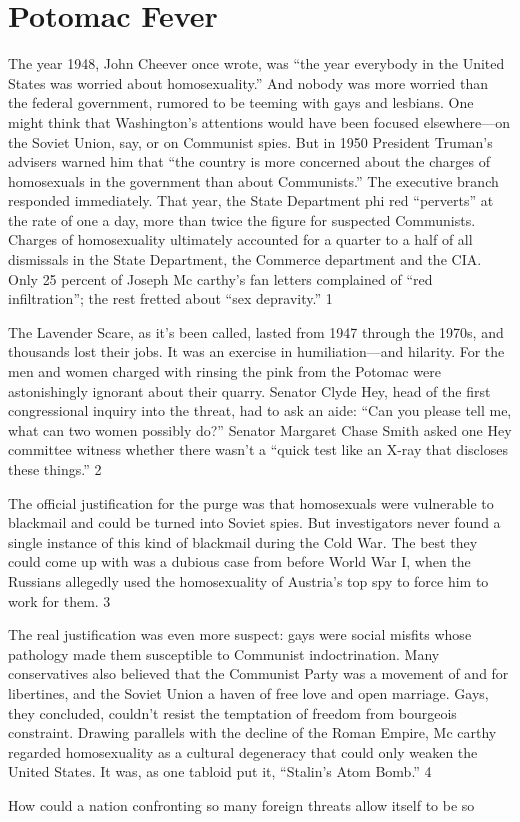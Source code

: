 {\chapter{Potomac Fever} } {\label{Potomac Fever} }{\par}{\textit{	} } {\par}{\par} {\textbf{\textit{	} } } {\par} 
	The year 1948, John Cheever once wrote, was “the year everybody in the United States was worried about homosexuality.” And nobody was more worried than the federal government, rumored to be teeming with gays and lesbians. One might think that Washington’s attentions would have been focused elsewhere—on the Soviet Union, say, or on Communist spies. But in 1950 President Truman’s advisers warned him that “the country is more concerned about the charges of homosexuals in the government than about Communists.” The executive branch responded immediately. That year, the State Department phi red “perverts” at the rate of one a day, more than twice the figure for suspected Communists. Charges of homosexuality ultimately accounted for a quarter to a half of all dismissals in the State Department, the Commerce department and the CIA. Only {\color{blue} 25 } percent of Joseph Mc carthy’s fan letters complained of “red infiltration”; the rest fretted about “sex depravity.” {\color{blue} 1 } {\par} The Lavender Scare, as it’s been called, lasted from 1947 through the 1970s, and thousands lost their jobs. It was an exercise in humiliation—and hilarity. For the men and women charged with rinsing the pink from the Potomac were astonishingly ignorant about their quarry. Senator Clyde Hey, head of the first congressional inquiry into the threat, had to ask an aide: “Can you please tell me, what can two women possibly do?” Senator Margaret Chase Smith asked one Hey committee witness whether there wasn’t a “quick test like an X-ray that discloses these things.” {\color{blue} 2 } {\par} The official justification for the purge was that homosexuals were vulnerable to blackmail and could be turned into Soviet spies. But investigators never found a single instance of this kind of blackmail during the Cold War. The best they could come up with was a dubious case from before World War I, when the Russians allegedly used the homosexuality of Austria’s top spy to force him to work for them. {\color{blue} 3 } {\par} The real justification was even more suspect: gays were social misfits whose pathology made them susceptible to Communist indoctrination. Many conservatives also believed that the Communist Party was a movement of and for libertines, and the Soviet Union a haven of free love and open marriage. Gays, they concluded, couldn’t resist the temptation of freedom from bourgeois constraint. Drawing parallels with the decline of the Roman Empire, Mc carthy regarded homosexuality as a cultural degeneracy that could only weaken the United States. It was, as one tabloid put it, “Stalin’s Atom Bomb.” {\color{blue} 4 } {\par} How could a nation confronting so many foreign threats allow itself to be so 